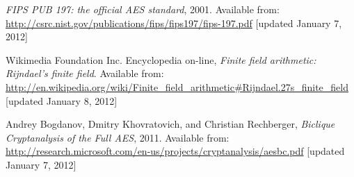 \documentclass{report}
\begin{document}
%
%
%
%   
%

\begin{thebibliography}{9}

    \emph{FIPS PUB 197: the official AES standard}, 2001. Available from: \url{http://csrc.nist.gov/publications/fips/fips197/fips-197.pdf} [updated January 7, 2012]

    Wikimedia Foundation Inc. Encyclopedia on-line, \emph{Finite field arithmetic: Rijndael's finite field}. Available from: \url{http://en.wikipedia.org/wiki/Finite_field_arithmetic#Rijndael.27s_finite_field} [updated January 8, 2012]

    Andrey Bogdanov, Dmitry Khovratovich, and Christian Rechberger, \emph{Biclique Cryptanalysis of the Full AES}, 2011. Available from: \url{http://research.microsoft.com/en-us/projects/cryptanalysis/aesbc.pdf} [updated January 7, 2012]

\end{thebibliography}
\end{document}
